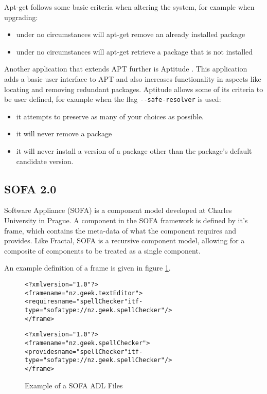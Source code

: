 Apt-get follows some basic criteria when altering the system, for example when upgrading:
\begin{itemize}
  \item under no circumstances will apt-get remove an already installed package
  \item under no circumstances will apt-get retrieve a package that is not installed
\end{itemize}

Another application that extends APT further is Aptitude \citep{Burrows2005}.
This application adds a basic user interface to APT and also increases functionality in aspects like locating and removing redundant packages.
Aptitude allows some of its criteria to be user defined, for example when the flag \verb+--safe-resolver+ is used:
\begin{itemize}
  \item it attempts to preserve as many of your choices as possible.
  \item it will never remove a package
  \item it will never install a version of a package other than the package's default candidate version.
\end{itemize}

\subsection{SOFA 2.0}
Software Appliance (SOFA) is a component model developed at Charles University in Prague.
A component in the SOFA framework is defined by it's frame, which contains the meta-data of what the component requires and provides.
Like Fractal, SOFA is a recursive component model, allowing for a composite of components to be treated as a single component.

An example definition of a frame is given in figure \ref{SOFAmetadata}.

\begin{figure}[htp] 
\begin{center}
\begin{alltt}
<?xml version="1.0"?>
<frame name="nz.geek.textEditor">
  <requires name="spellChecker" itf-type="sofatype://nz.geek.spellChecker"/>
</frame>

<?xml version="1.0"?>
<frame name="nz.geek.spellChecker">
  <provides name="spellChecker" itf-type="sofatype://nz.geek.spellChecker"/>
</frame>
\end{alltt}
  \caption[SOFA ADL files]{Example of a SOFA ADL Files}
  \label{SOFAmetadata}
\end{center}
\end{figure}

